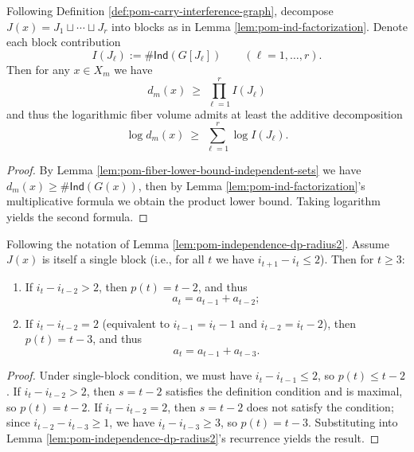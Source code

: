 \begin{corollary}\label{cor:pom-fiber-lower-bound-cascade}
Following Definition \ref{def:pom-carry-interference-graph}, decompose $J(x)=J_1\sqcup\cdots\sqcup J_r$ into blocks as in Lemma \ref{lem:pom-ind-factorization}.
Denote each block contribution
\[
I(J_\ell):=\#\mathsf{Ind}(G[J_\ell])\qquad(\ell=1,\dots,r).
\]
Then for any $x\in X_m$ we have
\[
\boxed{\;
d_m(x)\ \ge\ \prod_{\ell=1}^r I(J_\ell)\;}
\]
and thus the logarithmic fiber volume admits at least the additive decomposition
\[
\boxed{\;
\log d_m(x)\ \ge\ \sum_{\ell=1}^r \log I(J_\ell).\;}
\]
\end{corollary}
\begin{proof}
By Lemma \ref{lem:pom-fiber-lower-bound-independent-sets} we have $d_m(x)\ge \#\mathsf{Ind}(G(x))$, then by Lemma \ref{lem:pom-ind-factorization}'s multiplicative formula we obtain the product lower bound. Taking logarithm yields the second formula.
\end{proof}

\begin{lemma}[Local recurrence in single-block case: bifurcation between \texorpdfstring{$a_t=a_{t-1}+a_{t-2}$}{a=a+a} and \texorpdfstring{$a_t=a_{t-1}+a_{t-3}$}{a=a+a}]\label{lem:pom-ind-local-recurrence}
Following the notation of Lemma \ref{lem:pom-independence-dp-radius2}.
Assume $J(x)$ is itself a single block (i.e., for all $t$ we have $i_{t+1}-i_t\le 2$). Then for $t\ge 3$:
\begin{enumerate}
  \item If $i_t-i_{t-2}>2$, then $p(t)=t-2$, and thus
  \[
  a_t=a_{t-1}+a_{t-2};
  \]
  \item If $i_t-i_{t-2}=2$ (equivalent to $i_{t-1}=i_t-1$ and $i_{t-2}=i_t-2$), then $p(t)=t-3$, and thus
  \[
  a_t=a_{t-1}+a_{t-3}.
  \]
\end{enumerate}
\end{lemma}

\begin{proof}
Under single-block condition, we must have $i_t-i_{t-1}\le 2$, so $p(t)\le t-2$.
If $i_t-i_{t-2}>2$, then $s=t-2$ satisfies the definition condition and is maximal, so $p(t)=t-2$.
If $i_t-i_{t-2}=2$, then $s=t-2$ does not satisfy the condition; since $i_{t-2}-i_{t-3}\ge 1$, we have $i_t-i_{t-3}\ge 3$, so $p(t)=t-3$.
Substituting into Lemma \ref{lem:pom-independence-dp-radius2}'s recurrence yields the result.
\end{proof}

